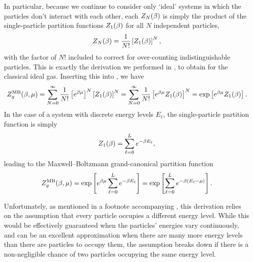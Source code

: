 In particular, because we continue to consider only `ideal' systems in which the particles don't interact with each other, each $Z_N(\beta)$ is simply the product of the single-particle partition functions $Z_1(\beta)$ for all $N$ independent particles,
\begin{equation*}
  Z_N(\beta) = \frac{1}{N!} \left[Z_1(\beta)\right]^N,
\end{equation*}
with the factor of $N!$ included to correct for over-counting indistinguishable particles.
This is exactly the derivation we performed in , to obtain  for the classical ideal gas.
Inserting this into , we have
\begin{equation*}
  Z_g^{\text{MB}}(\beta, \mu) = \sum_{N = 0}^{\infty} \frac{1}{N!} \left[e^{\beta\mu}\right]^N \left[Z_1(\beta)\right]^N = \sum_{N = 0}^{\infty} \frac{1}{N!} \left[e^{\beta\mu} Z_1(\beta)\right]^N = \exp\left[e^{\beta\mu} Z_1(\beta)\right].
\end{equation*}
In the case of a system with discrete energy levels $E_{\ell}$, the single-particle partition function is simply
\begin{equation*}
  Z_1(\beta) = \sum_{\ell = 0}^L e^{-\beta E_{\ell}},
\end{equation*}
leading to the Maxwell--Boltzmann grand-canonical partition function
\begin{equation}
  \label{eq:partfunc_MB_nonfactor}
  Z_g^{\text{MB}}(\beta, \mu) = \exp\left[e^{\beta\mu} \sum_{\ell = 0}^L e^{-\beta E_{\ell}} \right] = \exp\left[\sum_{\ell = 0}^L e^{-\beta\left(E_{\ell} - \mu\right)}\right].
\end{equation}

Unfortunately, as mentioned in a footnote accompanying , this derivation relies on the assumption that every particle occupies a different energy level.
While this would be effectively guaranteed when the particles' energies vary continuously, and can be an excellent approximation when there are many more energy levels than there are particles to occupy them, the assumption breaks down if there is a non-negligible chance of two particles occupying the same energy level.

